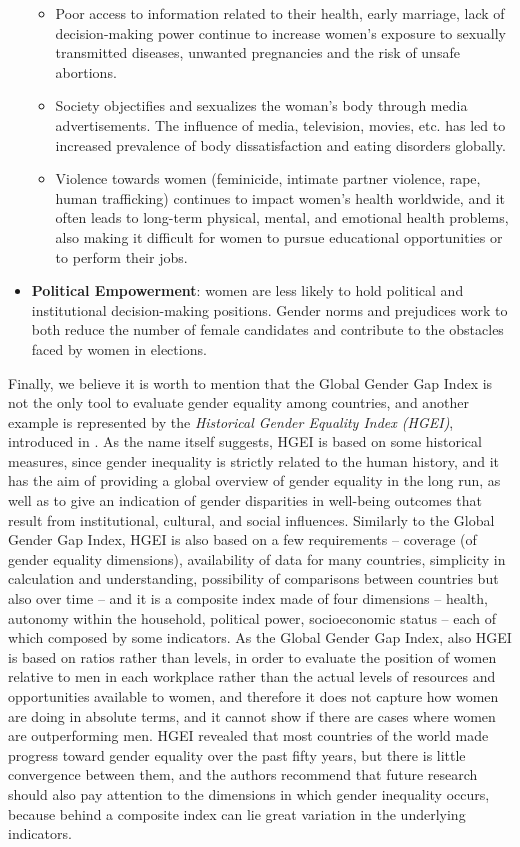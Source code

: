 \begin{itemize}
\begin{itemize}
\item Poor access to information related to their health, early marriage, lack of decision-making power continue to increase women's exposure to sexually transmitted diseases, unwanted pregnancies and the risk of unsafe abortions.
\item Society objectifies and sexualizes the woman's body through media advertisements. The influence of media, television, movies, etc. has led to increased prevalence of body dissatisfaction and eating disorders globally.
\item Violence towards women (feminicide, intimate partner violence, rape, human trafficking) continues to impact women's health worldwide, and it often leads to long-term physical, mental, and emotional health problems, also making it difficult for women to pursue educational opportunities or to perform their jobs.
\end{itemize}
\item \textbf{Political Empowerment}: women are less likely to hold political and institutional decision-making positions. Gender norms and prejudices work to both reduce the number of female candidates and contribute to the obstacles faced by women in elections.
\end{itemize}

Finally, we believe it is worth to mention that the Global Gender Gap Index is not the only tool to evaluate gender equality among countries, and another example is represented by the \textit{Historical Gender Equality Index (HGEI)}, introduced in \cite{dilli2018introducing}. As the name itself suggests, HGEI is based on some historical measures, since gender inequality is strictly related to the human history, and it has the aim of providing a global overview of gender equality in the long run, as well as to give an indication of gender disparities in well-being outcomes that result from institutional, cultural, and social influences.
Similarly to the Global Gender Gap Index, HGEI is also based on a few requirements -- coverage (of gender equality dimensions), availability of data for many countries, simplicity in calculation and understanding, possibility of comparisons between countries but also over time -- and it is a composite index made of four dimensions -- health, autonomy within the household, political power, socioeconomic status -- each of which composed by some indicators.
As the Global Gender Gap Index, also HGEI is based on ratios rather than levels, in order to evaluate the position of women relative to men in each workplace rather than the actual levels of resources and opportunities available to women, and therefore it does not capture how women are doing in absolute terms, and it cannot show if there are cases where women are outperforming men.
HGEI revealed that most countries of the world made progress toward gender equality over the past fifty years, but there is little convergence between them, and the authors recommend that future research should also pay attention to the dimensions in which gender inequality occurs, because behind a composite index can lie great variation in the underlying indicators.



